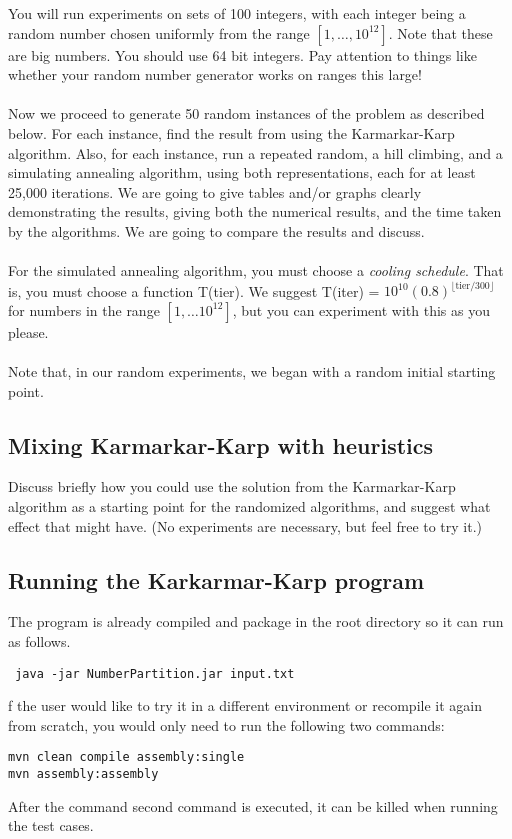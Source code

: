 \documentclass[tikz, 12pt]{scrartcl}
\begin{document}
You will run experiments on sets of 100 integers, with each integer being a random number chosen uniformly from the range $[1, \ldots, 10^{12}]$. Note that these are big numbers. You should use 64 bit integers. Pay attention to things like whether your random number generator works on ranges this large!\\
\\
Now we proceed to generate 50 random instances of the problem as described below. For each instance, find the result from using the Karmarkar-Karp algorithm. Also, for each instance, run a repeated random, a hill climbing, and a simulating annealing algorithm, using both representations, each for at least 25,000 iterations. We are going to give tables and/or graphs clearly demonstrating the results, giving both the numerical results, and the time taken by the algorithms. We are going to compare the results and discuss.\\
\\
For the simulated annealing algorithm, you must choose a \textit{cooling schedule}. That is, you must choose a function T(tier). We suggest T(iter) = $10^{10}(0.8)^{\lfloor \mbox{tier} / 300\rfloor}$ for numbers in the range $[1, \ldots 10^{12}]$, but you can experiment with this as you please.\\
\\
Note that, in our random experiments, we began with a random initial starting point.

\subsection{Mixing Karmarkar-Karp with heuristics}

Discuss briefly how you could use the solution from the Karmarkar-Karp algorithm as a starting point for the randomized algorithms, and suggest what effect that might have. (No experiments are necessary, but feel free to try it.)

\subsection{Running the Karkarmar-Karp program}
The program is already compiled and package in the root directory so it can run as follows.
\begin{verbatim}
 java -jar NumberPartition.jar input.txt 
\end{verbatim}

f the user would like to try it in a different environment or recompile it again from scratch, you would only need to run the following two commands:

\begin{verbatim}
mvn clean compile assembly:single
mvn assembly:assembly
\end{verbatim}

After the command second command is executed, it can be killed when running the test cases.
\end{document}

